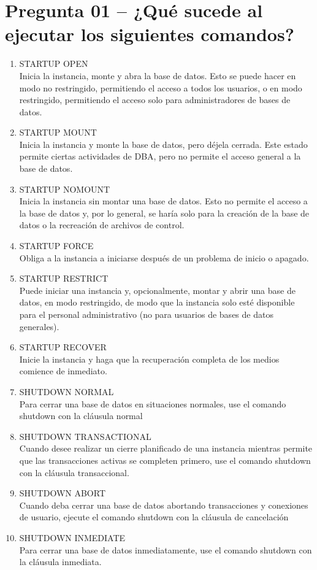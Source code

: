 \section{Pregunta 01 – ¿Qué sucede al ejecutar los siguientes comandos?} 

\begin{enumerate}
\item  STARTUP OPEN\\
Inicia la instancia, monte y abra la base de datos. Esto se puede hacer en modo no restringido, permitiendo el acceso a todos los usuarios, o en modo restringido, permitiendo el acceso solo para administradores de bases de datos.
\item  STARTUP MOUNT\\
Inicia la instancia y monte la base de datos, pero déjela cerrada. Este estado permite ciertas actividades de DBA, pero no permite el acceso general a la base de datos.
\item  STARTUP NOMOUNT\\
Inicia la instancia sin montar una base de datos. Esto no permite el acceso a la base de datos y, por lo general, se haría solo para la creación de la base de datos o la recreación de archivos de control.
\item  STARTUP FORCE\\
Obliga a la instancia a iniciarse después de un problema de inicio o apagado.
\item  STARTUP RESTRICT\\
Puede iniciar una instancia y, opcionalmente, montar y abrir una base de datos, en modo restringido, de modo que la instancia solo esté disponible para el personal administrativo (no para usuarios de bases de datos generales).
\item  STARTUP RECOVER\\
Inicie la instancia y haga que la recuperación completa de los medios comience de inmediato.
\item  SHUTDOWN NORMAL\\
Para cerrar una base de datos en situaciones normales, use el comando shutdown con la cláusula normal
\item  SHUTDOWN TRANSACTIONAL\\
Cuando desee realizar un cierre planificado de una instancia mientras permite que las transacciones activas se completen primero, use el comando shutdown con la cláusula transaccional.
\item  SHUTDOWN ABORT\\
Cuando deba cerrar una base de datos abortando transacciones y conexiones de usuario, ejecute el comando shutdown con la cláusula de cancelación
\item  SHUTDOWN INMEDIATE\\
Para cerrar una base de datos inmediatamente, use el comando shutdown con la cláusula inmediata.
\end{enumerate}